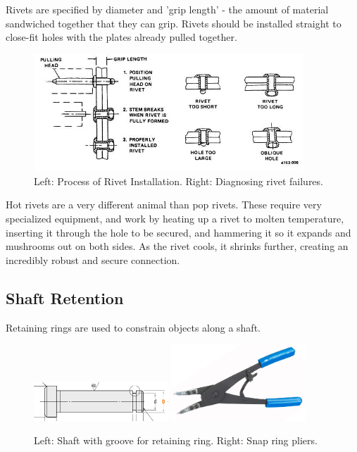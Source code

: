 \documentclass[10pt,letterpaper]{book}
\begin{document}
	Rivets are specified by diameter and 'grip length' - the amount of material sandwiched together that they can grip. Rivets should be installed straight to close-fit holes with the plates already pulled together.
	
	\begin{figure}[H] \centering
		\includegraphics[width=0.9\textwidth]{imgs/rivet_install.jpeg}
		\caption{Left: Process of Rivet Installation. Right: Diagnosing rivet failures.}
	\end{figure}
	
	Hot rivets are a very different animal than pop rivets. These require very specialized equipment, and work by heating up a rivet to molten temperature, inserting it through the hole to be secured, and hammering it so it expands and mushrooms out on both sides. As the rivet cools, it shrinks further, creating an incredibly robust and secure connection.	
	
	\subsection{Shaft Retention}
	
	Retaining rings are used to constrain objects along a shaft.
	
	\begin{figure}[H]
		\centering
		\includegraphics[width=0.45\textwidth]{imgs/shaft_snapringgroove.png}
		\includegraphics[width=0.45\textwidth]{imgs/snapringtool.jpeg}
		\caption{Left: Shaft with groove for retaining ring. Right: Snap ring pliers.}
	\end{figure}
	
\end{document}
